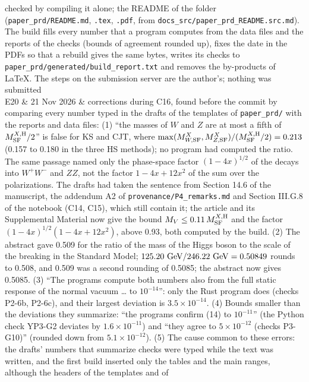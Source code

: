 \documentclass[
  10pt,
]{article}
\begin{document}
\begin{longtable}[]
checked by compiling it alone; the README of the folder
(\texttt{paper\_prd/README.md}, \texttt{.tex}, \texttt{.pdf}, from
\texttt{docs\_src/paper\_prd\_README.src.md}). The build fills every
number that a program computes from the data files and the reports of
the checks (bounds of agreement rounded up), fixes the date in the PDFs
so that a rebuild gives the same bytes, writes its checks to
\texttt{paper\_prd/generated/build\_report.txt} and removes the
by-products of LaTeX. The steps on the submission server are the
author's; nothing was submitted \\
E20 & 21 Nov 2026 & corrections during C16, found before the commit by
comparing every number typed in the drafts of the templates of
\texttt{paper\_prd/} with the reports and data files: (1) ``the masses
of \(W\) and \(Z\) are at most a fifth of \(M^{X,{\rm H}}_{\rm SF}/2\)''
is false for KS and CJT, where
\(\max(M^X_{W,{\rm SF}},M^X_{Z,{\rm SF}})/(M^{X,{\rm H}}_{\rm SF}/2)=0.213\)
(0.157 to 0.180 in the three HS methods); no program had computed the
ratio. The same passage named only the phase-space factor
\((1-4x)^{1/2}\) of the decays into \(W^+W^-\) and \(ZZ\), not the
factor \(1-4x+12x^2\) of the sum over the polarizations. The drafts had
taken the sentence from Section 14.6 of the manuscript, the addendum A2
of \texttt{provenance/P4\_remarks.md} and Section III.G.8 of the
notebook (C14, C15), which still contain it; the article and its
Supplemental Material now give the bound
\(M_V\le0.11\,M^{X,{\rm H}}_{\rm SF}\) and the factor
\((1-4x)^{1/2}(1-4x+12x^2)\), above 0.93, both computed by the build.
(2) The abstract gave 0.509 for the ratio of the mass of the Higgs boson
to the scale of the breaking in the Standard Model;
\(125.20\ {\rm GeV}/246.22\ {\rm GeV}=0.50849\) rounds to 0.508, and
0.509 was a second rounding of 0.5085; the abstract now gives 0.5085.
(3) ``The programs compute both numbers also from the full static
response of the normal vacuum \ldots{} to \(10^{-14}\)'': only the Rust
program does (checks P2-6b, P2-6c), and their largest deviation is
\(3.5\times10^{-14}\). (4) Bounds smaller than the deviations they
summarize: ``the programs confirm (14) to \(10^{-11}\)'' (the Python
check YP3-G2 deviates by \(1.6\times10^{-11}\)) and ``they agree to
\(5\times10^{-12}\) (checks P3-G10)'' (rounded down from
\(5.1\times10^{-12}\)). (5) The cause common to these errors: the
drafts' numbers that summarize checks were typed while the text was
written, and the first build inserted only the tables and the main
ranges, although the headers of the templates and of

\end{longtable}
\end{document}
